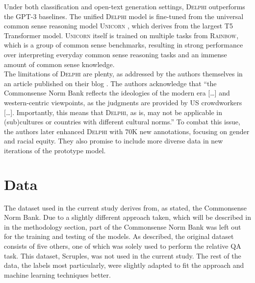 \documentclass[final]{clv3} %
\begin{document}
Under both classification and open-text generation settings, \textsc{Delphi} outperforms the GPT-3 baselines. The unified \textsc{Delphi} model is fine-tuned from the universal common sense reasoning model \textsc{Unicorn} \cite{lourie}, which derives from the largest T5 Transformer model. \textsc{Unicorn} itself is trained on multiple tasks from \textsc{Rainbow}, which is a group of common sense benchmarks, resulting in strong performance over interpreting everyday common sense reasoning tasks and an immense amount of common sense knowledge.\\

The limitations of \textsc{Delphi} are plenty, as addressed by the authors themselves in an article published on their blog \cite{jiang-blog}. The authors acknowledge that “the Commonsense Norm Bank reflects the ideologies of the modern era […] and western-centric viewpoints, as the judgments are provided by US crowdworkers […]. Importantly, this means that \textsc{Delphi}, as is, may not be applicable in (sub)cultures or countries with different cultural norms.” To combat this issue, the authors later enhanced \textsc{Delphi} with 70K new annotations, focusing on gender and racial equity. They also promise to include more diverse data in new iterations of the prototype model. 


\section{Data}

The dataset used in the current study derives from, as stated, the Commonsense Norm Bank. Due to a slightly different approach taken, which will be described in in the methodology section, part of the Commonsense Norm Bank was left out for the training and testing of the models. As described, the original dataset consists of five others, one of which was solely used to perform the relative QA task. This dataset, Scruples, was not used in the current study. The rest of the data, the labels most particularly, were slightly adapted to fit the approach and machine learning techniques better. \\
\end{document}
